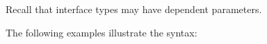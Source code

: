 
\noindent
Recall that interface types may have dependent parameters.

\noindent
The following examples illustrate the syntax:

